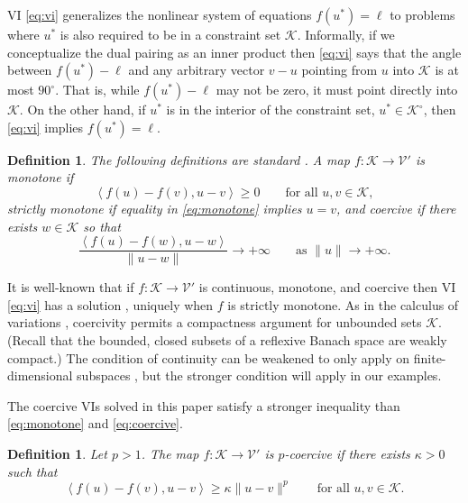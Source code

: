\documentclass[letterpaper,final,12pt,reqno]{amsart}
\theoremstyle{cstyle}
\theoremstyle{cstyle*}
\theoremstyle{dstyle}
\newtheorem{definition}[theorem]{Definition}
\numberwithin{equation}{section}
\numberwithin{figure}{section}
\numberwithin{table}{section}
\numberwithin{theorem}{section}
\newcommand{\cK}{\mathcal{K}}
\newcommand{\cV}{\mathcal{V}}
\newcommand{\ip}[2]{\left<#1,#2\right>}
\begin{document}
VI \eqref{eq:vi} generalizes the nonlinear system of equations $f(u^*)=\ell$ to problems where $u^*$ is also required to be in a constraint set $\cK$.  Informally, if we conceptualize the dual pairing as an inner product then \eqref{eq:vi} says that the angle between $f(u^*)-\ell$ and any arbitrary vector $v-u$ pointing from $u$ into $\cK$ is at most $90^\circ$.  That is, while $f(u^*)-\ell$ may not be zero, it must point directly into $\cK$.  On the other hand, if $u^*$ is in the interior of the constraint set, $u^*\in\cK^\circ$, then \eqref{eq:vi} implies $f(u^*)=\ell$.

\begin{definition} The following definitions are standard \cite{KinderlehrerStampacchia1980}.  A map $f:\cK \to \cV'$ is \emph{monotone} if
\begin{equation}
\ip{f(u)-f(v)}{u-v} \ge 0 \qquad \text{for all } u,v \in \cK, \label{eq:monotone}
\end{equation}
\emph{strictly monotone} if equality in \eqref{eq:monotone} implies $u=v$, and \emph{coercive} if there exists $w \in \cK$ so that
\begin{equation}
\frac{\ip{f(u)-f(w)}{u-w}}{\|u-w\|} \to +\infty \qquad \text{as } \|u\|\to +\infty. \label{eq:coercive}
\end{equation}
\end{definition}

It is well-known that if $f:\cK \to \cV'$ is continuous, monotone, and coercive then VI \eqref{eq:vi} has a solution \cite[Corollary III.1.8]{KinderlehrerStampacchia1980}, uniquely when $f$ is strictly monotone.  As in the calculus of variations \cite{Evans2010}, coercivity permits a compactness argument for unbounded sets $\cK$.  (Recall that the bounded, closed subsets of a reflexive Banach space are weakly compact.)  The condition of continuity can be weakened to only apply on finite-dimensional subspaces \cite{KinderlehrerStampacchia1980}, but the stronger condition will apply in our examples.

The coercive VIs solved in this paper satisfy a stronger inequality than \eqref{eq:monotone} and \eqref{eq:coercive}.

\begin{definition}  Let $p>1$.  The map $f:\cK \to \cV'$ is \emph{$p$-coercive} if there exists $\kappa>0$ such that
\begin{equation}
\ip{f(u)-f(v)}{u-v} \ge \kappa \|u-v\|^p \qquad \text{for all } u,v \in \cK. \label{eq:pcoercive}
\end{equation}
\end{definition}
\end{document}
